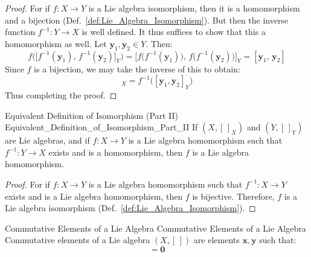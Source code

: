     \begin{proof}
        For if $f:X\rightarrow{Y}$ is a Lie algebra isomorphism, then it
        is a homomorphism and a bijection
        (Def.~\ref{def:Lie_Algebra_Isomorphism}). But then the inverse
        function $f^{\minus{1}}:Y\rightarrow{X}$ is well defined. It thus
        suffices to show that this a homomorphism as well. Let
        $\mathbf{y}_{1},\mathbf{y}_{2}\in{Y}$. Then:
        \begin{equation}
            f\Big(\big[f^{\minus{1}}(\mathbf{y}_{1}),\,
                       f^{\minus{1}}(\mathbf{y}_{2})\big]_{Y}\Big)
            =\Big[f\big(f^{\minus{1}}(\mathbf{y}_{1})\big),\,
                  f\big(f^{\minus{1}}(\mathbf{y}_{2})\big)\Big]_{Y}
            =[\mathbf{y}_{1},\,\mathbf{y}_{2}]
        \end{equation}
        Since $f$ is a bijection, we may take the inverse of
        this to obtain:
        \begin{equation}
            [f^{\minus{1}}(\mathbf{y}_{1}),
             f^{\minus{1}}(\mathbf{y}_{2})]_{X}=
            f^{\minus{1}}\Big([\mathbf{y}_{1},\mathbf{y}_{2}]_{Y}\Big)
        \end{equation}
        Thus completing the proof.
    \end{proof}
    \begin{ltheorem}{Equivalent Definition of Isomorphism (Part II)}
                    {Equivalent_Definition_of_Isomorphism_Part_II}
        If $(X,[\,]_{X})$ and $(Y,[\,]_{Y})$ are Lie algebras, and if
        $f:X\rightarrow{Y}$ is a Lie algebra homomorphism such that
        $f^{\minus{1}}:Y\rightarrow{X}$ exists and is a homomorphism,
        then $f$ is a Lie algebra homomorphism.
    \end{ltheorem}
    \begin{proof}
        For if $f:X\rightarrow{Y}$ is a Lie algebra homomorphism such that
        $f^{\minus{1}}:X\rightarrow{Y}$ exists and is a Lie algebra
        homomorphism, then $f$ is bijective. Therefore, $f$ is a
        Lie algebra isomorphism (Def.~\ref{def:Lie_Algebra_Isomorphism}).
    \end{proof}
    \begin{fdefinition}{Commutative Elements of a Lie Algebra}
                       {Commutative Elements of a Lie Algebra}
        Commutative elements of a Lie algebra $(X,[\,])$ are elements
        $\mathbf{x},\mathbf{y}$ such that:
        \begin{equation}
            [\mathbf{x},\,\mathbf{y}]=\mathbf{0}
        \end{equation}
    \end{fdefinition}
